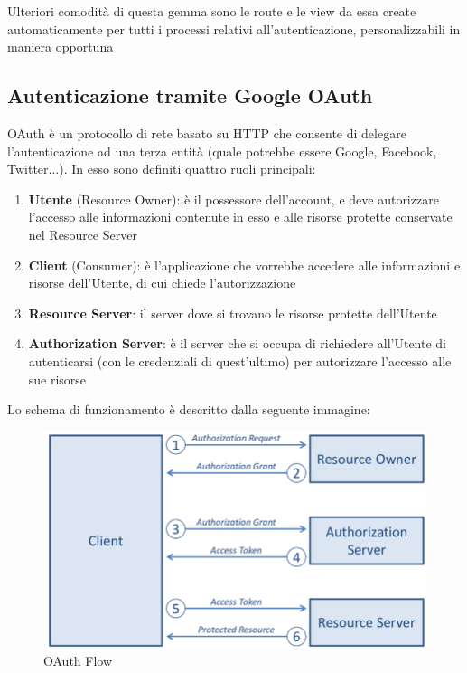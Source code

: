 \documentclass[Lau, binding=0.6cm]{sapthesis}
\begin{document}
Ulteriori comodità di questa gemma sono le route e le view da essa create automaticamente per tutti i processi relativi all’autenticazione, personalizzabili in maniera opportuna

\subsection{Autenticazione tramite Google OAuth}

OAuth è un protocollo di rete basato su HTTP che consente di delegare l’autenticazione ad una terza entità (quale potrebbe essere Google, Facebook, Twitter...). In esso sono definiti quattro ruoli principali:

\begin{enumerate}
	\item \textbf{Utente} (Resource Owner): è il possessore dell’account, e deve autorizzare l’accesso alle informazioni contenute in esso e alle risorse protette conservate nel Resource Server
	\item \textbf{Client} (Consumer): è l’applicazione che vorrebbe accedere alle informazioni e risorse dell’Utente, di cui chiede l’autorizzazione
	\item \textbf{Resource Server}: il server dove si trovano le risorse protette dell’Utente
	\item \textbf{Authorization Server}: è il server che si occupa di richiedere all’Utente di autenticarsi (con le credenziali di quest’ultimo) per autorizzare l’accesso alle sue risorse
\end{enumerate}

Lo schema di funzionamento è descritto dalla seguente immagine:\\

\begin{figure}[H]
	\centering
	\includegraphics[width=0.90\linewidth]{images/oauth}
	\caption{OAuth Flow}
	\label{fig:oauth}
\end{figure}
\end{document}
